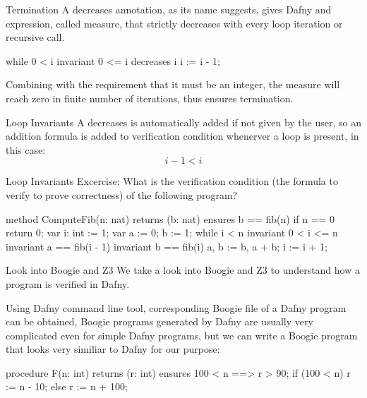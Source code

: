 \documentclass[10pt, compress]{beamer}
\begin{document}
\begin{frame}[fragile]{Termination}
A decreases annotation, as its name suggests, gives Dafny and expression, called measure, that strictly decreases with every loop iteration or recursive call.
  \begin{verbnobox}[\footnotesize]
while 0 < i
   invariant 0 <= i
   decreases i
{
   i := i - 1;
}
  \end{verbnobox}
Combining with the requirement that it must be an integer, the measure will reach zero in finite number of iterations, thus ensures termination.
\end{frame}

\begin{frame}[fragile]{Loop Invariants}
A decreases is automatically added if not given by the user, so an addition formula is added to verification condition whenerver a loop is present, in this case:
  $$i - 1 < i$$
\end{frame}

\begin{frame}[fragile]{Loop Invariants}
  Excercise: What is the verification condition (the formula to verify to prove correctness) of the following program?
  \begin{verbnobox}[\footnotesize]
method ComputeFib(n: nat) returns (b: nat)
   ensures b == fib(n)
{
   if n == 0 { return 0; }
   var i: int := 1;
   var a := 0;
       b := 1;
   while i < n
      invariant 0 < i <= n
      invariant a == fib(i - 1)
      invariant b == fib(i)
   {
      a, b := b, a + b;
      i := i + 1;
   }
}
  \end{verbnobox}
\end{frame}

\begin{frame}[fragile]{Look into Boogie and Z3}
  We take a look into Boogie and Z3 to understand how a program is verified in Dafny.

  Using Dafny command line tool, corresponding Boogie file of a Dafny program can be obtained,
  Boogie programs generated by Dafny are usually very complicated even for simple Dafny programs, but we can write a Boogie program that looks very similiar to Dafny for our purpose:
  \begin{verbnobox}[\footnotesize]
procedure F(n: int) returns (r: int)
  ensures 100 < n ==> r > 90;
{
  if (100 < n) {
    r := n - 10;
  } else {
    r := n + 100;
  }
}
  \end{verbnobox}
\end{frame}
\end{document}
